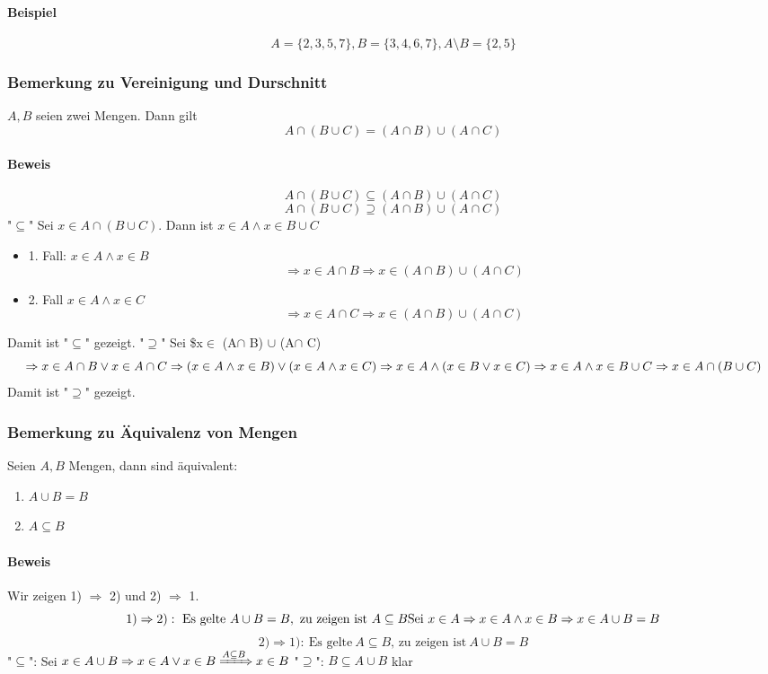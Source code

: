 \documentclass[a4paper]{scrartcl}
\theoremstyle{definition}
\theoremstyle{plain}
\theoremstyle{plain}
\theoremstyle{remark}
\theoremstyle{remark}
\theoremstyle{remark}
\begin{document}
\paragraph{Beispiel}
\label{sec-2-4-8-1}
\[A=\{2,3,5,7\}, B=\{3,4,6,7\}, A\setminus B = \{2,5\}\]
\subsubsection{Bemerkung zu Vereinigung und Durschnitt}
\label{sec-2-4-9}
$A,B$ seien zwei Mengen. Dann gilt \[A\cap (B\cup C) = (A\cap B) \cup (A\cap C)\]
\paragraph{Beweis}
\label{sec-2-4-9-1}
\[A\cap(B\cup C) \subseteq (A\cap B) \cup (A\cap C)\]
\[A\cap(B\cup C) \supseteq (A\cap B) \cup (A\cap C)\]
"$\subseteq$" Sei $x\in A \cap (B\cup C)$. Dann ist $x\in A \wedge x\in B\cup C$
\begin{itemize}
\item 1. Fall: $x\in A \wedge x\in B$
       \[\Rightarrow x\in A\cap B \Rightarrow x \in (A\cap B) \cup (A\cap C)\]
\item 2. Fall $x\in A \wedge x\in C$
       \[\Rightarrow x\in A\cap C \Rightarrow x\in (A\cap B)\cup(A\cap C)\]
\end{itemize}
Damit ist "$\subseteq$" gezeigt.
"$\supseteq$" Sei \$x$\in$ (A$\cap$ B) $\cup$ (A$\cap$ C)
\[\Rightarrow x\in A\cap B \vee x\in A\cap C \\ \Rightarrow (x\in A \wedge x\in B) \vee (x\in A \wedge x\in C) \\ \Rightarrow x\in A \wedge (x\in B\vee x\in C) \\ \Rightarrow x\in A \wedge x\in B\cup C \\ \Rightarrow x\in A\cap (B\cup C)\]
Damit ist "$\supseteq$" gezeigt.
\subsubsection{Bemerkung zu Äquivalenz von Mengen}
\label{sec-2-4-10}
Seien $A,B$ Mengen, dann sind äquivalent:
\begin{enumerate}
\item $A\cup B = B$
\item $A\subseteq B$
\end{enumerate}
\paragraph{Beweis}
\label{sec-2-4-10-1}
Wir zeigen 1) $\Rightarrow$ 2) und 2) $\Rightarrow$ 1.
\[1) \Rightarrow 2):~\text{Es gelte}~A\cup B = B,~\text{zu zeigen ist}~A\subseteq B \\ \text{Sei}~x\in A \Rightarrow x\in A \wedge x \in B \Rightarrow x\in A\cup B = B\]
\[2) \Rightarrow 1):~\text{Es gelte}~A\subseteq B\text{, zu zeigen ist}~A\cup B = B \]
"$\subseteq$": Sei $x\in A\cup B \Rightarrow x\in A \vee x\in B \xRightarrow{A\subseteq B} x\in B$
"$\supseteq$": $B\subseteq A\cup B$ klar
\end{document}
